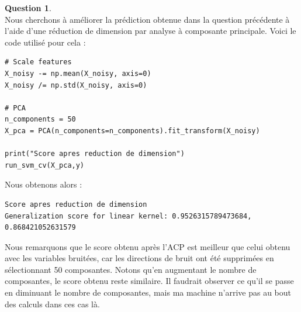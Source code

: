 \documentclass[11pt,a4paper]{article}
\theoremstyle{definition}
\newtheorem{Qu}{Question}
\begin{document}
\begin{Qu}~\\

Nous cherchons à améliorer la prédiction obtenue dans la question précédente à l'aide d'une réduction de dimension par analyse à composante principale. Voici le code utilisé pour cela : 

\begin{verbatim}
# Scale features
X_noisy -= np.mean(X_noisy, axis=0)
X_noisy /= np.std(X_noisy, axis=0)

# PCA
n_components = 50
X_pca = PCA(n_components=n_components).fit_transform(X_noisy)

print("Score apres reduction de dimension")
run_svm_cv(X_pca,y)
\end{verbatim}

Nous obtenons alors : 

\begin{verbatim}
Score apres reduction de dimension
Generalization score for linear kernel: 0.9526315789473684, 0.868421052631579
\end{verbatim}

Nous remarquons que le score obtenu après l'ACP est meilleur que celui obtenu avec les variables bruitées, car les directions de bruit ont été supprimées en sélectionnant 50 composantes. Notons qu'en augmentant le nombre de composantes, le score obtenu reste similaire. Il faudrait observer ce qu'il se passe en diminuant le nombre de composantes, mais ma machine n'arrive pas au bout des calculs dans ces cas là. 


 
\end{Qu}
\end{document}
